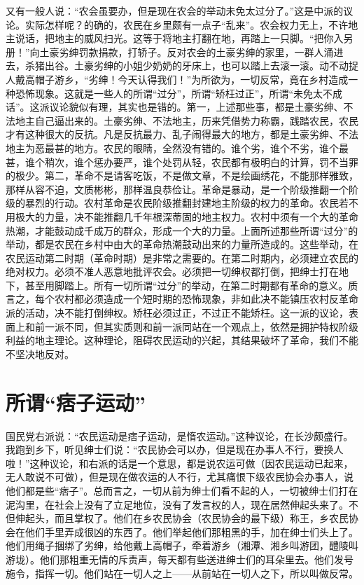 又有一般人说：“农会虽要办，但是现在农会的举动未免太过分了。”这是中派的议论。实际怎样呢？的确的，农民在乡里颇有一点子“乱来”。农会权力无上，不许地主说话，把地主的威风扫光。这等于将地主打翻在地，再踏上一只脚。“把你入另册！”向土豪劣绅罚款捐款，打轿子。反对农会的土豪劣绅的家里，一群人涌进去，杀猪出谷。土豪劣绅的小姐少奶奶的牙床上，也可以踏上去滚一滚。动不动捉人戴高帽子游乡，“劣绅！今天认得我们！”为所欲为，一切反常，竟在乡村造成一种恐怖现象。这就是一些人的所谓“过分”，所谓“矫枉过正”，所谓“未免太不成话”。这派议论貌似有理，其实也是错的。第一，上述那些事，都是土豪劣绅、不法地主自己逼出来的。土豪劣绅、不法地主，历来凭借势力称霸，践踏农民，农民才有这种很大的反抗。凡是反抗最力、乱子闹得最大的地方，都是土豪劣绅、不法地主为恶最甚的地方。农民的眼睛，全然没有错的。谁个劣，谁个不劣，谁个最甚，谁个稍次，谁个惩办要严，谁个处罚从轻，农民都有极明白的计算，罚不当罪的极少。第二，革命不是请客吃饭，不是做文章，不是绘画绣花，不能那样雅致，那样从容不迫，文质彬彬，那样温良恭俭让。革命是暴动，是一个阶级推翻一个阶级的暴烈的行动。农村革命是农民阶级推翻封建地主阶级的权力的革命。农民若不用极大的力量，决不能推翻几千年根深蒂固的地主权力。农村中须有一个大的革命热潮，才能鼓动成千成万的群众，形成一个大的力量。上面所述那些所谓“过分”的举动，都是农民在乡村中由大的革命热潮鼓动出来的力量所造成的。这些举动，在农民运动第二时期（革命时期）是非常之需要的。在第二时期内，必须建立农民的绝对权力。必须不准人恶意地批评农会。必须把一切绅权都打倒，把绅士打在地下，甚至用脚踏上。所有一切所谓“过分”的举动，在第二时期都有革命的意义。质言之，每个农村都必须造成一个短时期的恐怖现象，非如此决不能镇压农村反革命派的活动，决不能打倒绅权。矫枉必须过正，不过正不能矫枉。这一派的议论，表面上和前一派不同，但其实质则和前一派同站在一个观点上，依然是拥护特权阶级利益的地主理论。这种理论，阻碍农民运动的兴起，其结果破坏了革命，我们不能不坚决地反对。

\section{所谓“痞子运动”}

国民党右派说：“农民运动是痞子运动，是惰农运动。”这种议论，在长沙颇盛行。我跑到乡下，听见绅士们说：“农民协会可以办，但是现在办事人不行，要换人啦！”这种议论，和右派的话是一个意思，都是说农运可做（因农民运动已起来，无人敢说不可做），但是现在做农运的人不行，尤其痛恨下级农民协会办事人，说他们都是些“痞子”。总而言之，一切从前为绅士们看不起的人，一切被绅士们打在泥沟里，在社会上没有了立足地位，没有了发言权的人，现在居然伸起头来了。不但伸起头，而且掌权了。他们在乡农民协会（农民协会的最下级）称王，乡农民协会在他们手里弄成很凶的东西了。他们举起他们那粗黑的手，加在绅士们头上了。他们用绳子捆绑了劣绅，给他戴上高帽子，牵着游乡（湘潭、湘乡叫游团，醴陵叫游垅）。他们那粗重无情的斥责声，每天都有些送进绅士们的耳朵里去。他们发号施令，指挥一切。他们站在一切人之上——从前站在一切人之下，所以叫做反常。

